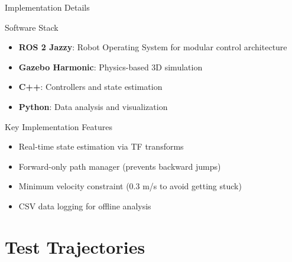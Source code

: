 \documentclass[10pt]{beamer}
\begin{document}
\begin{frame}{Implementation Details}
  \begin{block}{Software Stack}
    \begin{itemize}
      \item \textbf{ROS 2 Jazzy}: Robot Operating System for modular control architecture
      \item \textbf{Gazebo Harmonic}: Physics-based 3D simulation
      \item \textbf{C++}: Controllers and state estimation
      \item \textbf{Python}: Data analysis and visualization
    \end{itemize}
  \end{block}

  \vspace{0.3cm}

  \begin{block}{Key Implementation Features}
    \begin{itemize}
      \item Real-time state estimation via TF transforms
      \item Forward-only path manager (prevents backward jumps)
      \item Minimum velocity constraint (0.3 m/s to avoid getting stuck)
      \item CSV data logging for offline analysis
    \end{itemize}
  \end{block}
\end{frame}

\section{Test Trajectories}
\end{document}

